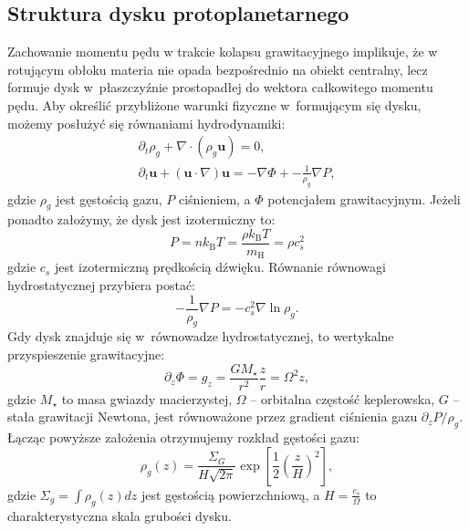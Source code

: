 \subsection{Struktura dysku protoplanetarnego}
Zachowanie momentu pędu w trakcie kolapsu grawitacyjnego implikuje, że w
rotującym obłoku materia nie opada bezpośrednio na obiekt centralny, lecz formuje dysk
w~płaszczyźnie prostopadłej do wektora całkowitego momentu pędu. Aby określić
przybliżone warunki fizyczne w~formującym się dysku, możemy posłużyć się
równaniami hydrodynamiki:
%
\begin{gather}
   \partial_t \rho_g + \nabla\cdot\left(\rho_g\mathbf{u}\right) = 0,
   \label{eq:hd1}\\
\partial_t \mathbf{u} + \left(\mathbf{u}\cdot\nabla\right)\mathbf{u} = 
-\nabla\Phi + -\frac{1}{\rho_g} \nabla P, \label{eq:hd2}
\end{gather}
%
gdzie $\rho_g$ jest gęstością gazu, $P$ ciśnieniem, a $\Phi$ potencjałem
grawitacyjnym. Jeżeli ponadto założymy, że dysk jest izotermiczny to:
%
\begin{equation}
   P = n k_{\textrm{B}} T = \frac{\rho k_{\textrm{B}} T}{m_{\textrm{H}}} = \rho
   c_s^2 
\end{equation}
gdzie $c_s$ jest izotermiczną prędkością dźwięku.
Równanie równowagi hydrostatycznej przybiera postać:
\begin{equation}
   -\frac{1}{\rho_g}\nabla P = -c_s^2\nabla\ln\rho_g.
\end{equation}
%
Gdy dysk znajduje się w~równowadze hydrostatycznej, to wertykalne
przyspieszenie grawitacyjne:
%
\begin{equation}
   \partial_z \Phi = g_z = \frac{GM_\star}{r^2}\frac{z}{r} = \Omega^2 z,
\end{equation} 
%
gdzie $M_\star$ to masa gwiazdy macierzystej, $\Omega$ -- orbitalna częstość
keplerowska, $G$ -- stała grawitacji Newtona, jest równoważone przez gradient
ciśnienia gazu $\partial_z P / \rho_g$.
Łącząc powyższe założenia otrzymujemy rozkład gęstości gazu:
%
\begin{equation} \label{eq:zeq}
   \rho_g(z) = \frac{\Sigma_G}{H\sqrt{2\pi}} \exp \left[
   \frac{1}{2}\left(\frac{z}{H}\right)^2 \right],
\end{equation}
%
gdzie $\Sigma_g = \int \rho_g(z) dz$ jest gęstością powierzchniową, a
$H=\frac{c_s}{\Omega}$ to charakterystyczna skala grubości dysku.
%
